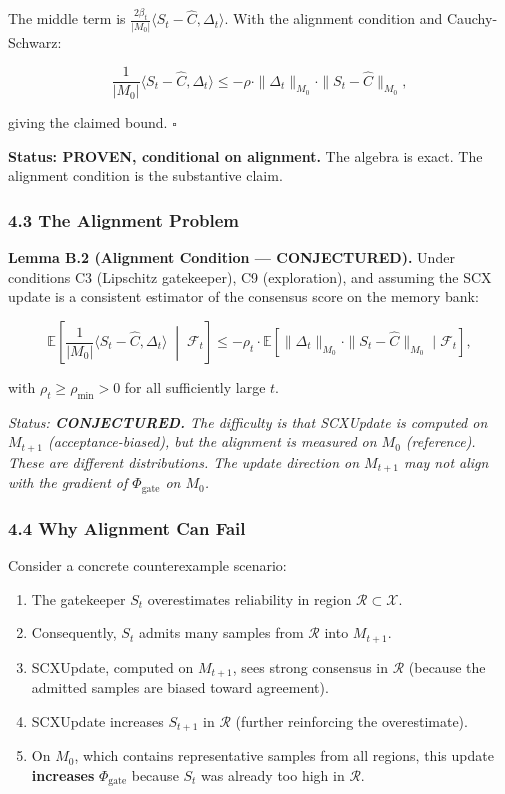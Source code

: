 \documentclass[
  12pt,
]{article}
\providecommand{\tightlist}{%
  \setlength{\itemsep}{0pt}\setlength{\parskip}{0pt}}
\begin{document}
The middle term is
\(\frac{2\beta_t}{|M_0|} \langle S_t - \hat{C}, \Delta_t \rangle\). With
the alignment condition and Cauchy-Schwarz:

\[\frac{1}{|M_0|}\langle S_t - \hat{C}, \Delta_t \rangle \leq -\rho \cdot \|\Delta_t\|_{M_0} \cdot \|S_t - \hat{C}\|_{M_0},\]

giving the claimed bound. \(\square\)

\textbf{Status: PROVEN, conditional on alignment.} The algebra is exact.
The alignment condition is the substantive claim.

\subsubsection{4.3 The Alignment Problem}\label{the-alignment-problem}

\textbf{Lemma B.2 (Alignment Condition --- CONJECTURED).} Under
conditions C3 (Lipschitz gatekeeper), C9 (exploration), and assuming the
SCX update is a consistent estimator of the consensus score on the
memory bank:

\[\mathbb{E}\left[\frac{1}{|M_0|}\langle S_t - \hat{C}, \Delta_t \rangle \;\middle|\; \mathcal{F}_t\right] \leq -\rho_t \cdot \mathbb{E}[\|\Delta_t\|_{M_0} \cdot \|S_t - \hat{C}\|_{M_0} \mid \mathcal{F}_t],\]

with \(\rho_t \geq \rho_{\min} > 0\) for all sufficiently large \(t\).

\emph{Status: \textbf{CONJECTURED.} The difficulty is that SCXUpdate is
computed on \(M_{t+1}\) (acceptance-biased), but the alignment is
measured on \(M_0\) (reference). These are different distributions. The
update direction on \(M_{t+1}\) may not align with the gradient of
\(\Phi_{\text{gate}}\) on \(M_0\).}

\subsubsection{4.4 Why Alignment Can Fail}\label{why-alignment-can-fail}

Consider a concrete counterexample scenario:

\begin{enumerate}
\def\labelenumi{\arabic{enumi}.}
\tightlist
\item
  The gatekeeper \(S_t\) overestimates reliability in region
  \(\mathcal{R} \subset \mathcal{X}\).
\item
  Consequently, \(S_t\) admits many samples from \(\mathcal{R}\) into
  \(M_{t+1}\).
\item
  SCXUpdate, computed on \(M_{t+1}\), sees strong consensus in
  \(\mathcal{R}\) (because the admitted samples are biased toward
  agreement).
\item
  SCXUpdate increases \(S_{t+1}\) in \(\mathcal{R}\) (further
  reinforcing the overestimate).
\item
  On \(M_0\), which contains representative samples from all regions,
  this update \textbf{increases} \(\Phi_{\text{gate}}\) because \(S_t\)
  was already too high in \(\mathcal{R}\).
\end{enumerate}
\end{document}

